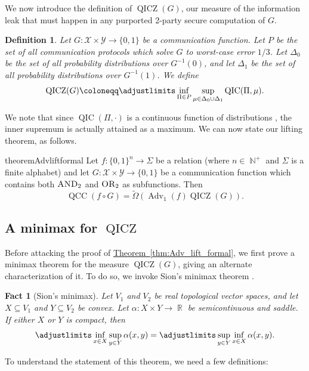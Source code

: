 \documentclass[10pt,a4paper]{article}
\newtheorem{definition}[theorem]{Definition}
\newtheorem{fact}[theorem]{Fact}
\theoremstyle{definition}
\newcommand{\thm}[1]{\hyperref[thm:#1]{Theorem~\ref*{thm:#1}}}
\newcommand{\tOmega}{\tilde{\Omega}}
\newcommand{\B}{\{0,1\}}
\newcommand{\X}{\mathcal{X}}
\newcommand{\Y}{\mathcal{Y}}
\renewcommand{\>}{\rangle}
\newcommand{\<}{\langle}
\DeclareMathOperator{\bR}{\mathbb{R}}
\DeclareMathOperator{\bN}{\mathbb{N}}
\newcommand{\OR}{\textsc{OR}}
\newcommand{\AND}{\textsc{AND}}
\DeclareMathOperator{\Adv}{Adv}
\DeclareMathOperator{\QCC}{QCC}
\DeclareMathOperator{\QICZ}{QICZ}
\DeclareMathOperator{\QIC}{QIC}
\begin{document}
We now introduce the definition of $\QICZ(G)$,
our measure of the information leak that must
happen in any purported 2-party secure computation of $G$.

\begin{definition}
Let $G\colon\X\times\Y\to\B$ be a communication function.
Let $P$ be the set of all communication protocols
which solve $G$ to worst-case error $1/3$.
Let $\Delta_0$ be the set of all probability
distributions over $G^{-1}(0)$, and let
$\Delta_1$ be the set of all probability distributions
over $G^{-1}(1)$. We define
\[\QICZ(G)\coloneqq\adjustlimits
\inf_{\Pi\in P}\sup_{\mu\in\Delta_0\cup\Delta_1}
\QIC(\Pi,\mu).\]
\end{definition}

We note that since $\QIC(\Pi,\cdot)$ is a continuous
function of distributions \cite{BGK+18}, the inner
supremum is actually attained as a maximum.
We can now state our lifting theorem, as follows.


\begin{restatable}{theorem}{Advliftformal}\label{thm:Adv_lift_formal}
Let $f\colon\B^n\to\Sigma$ be a relation
(where $n\in\bN^{+}$ and $\Sigma$ is a finite alphabet)
and let $G\colon\X\times\Y\to\B$ be a communication
function which contains both $\AND_2$ and $\OR_2$
as subfunctions. Then
\[\QCC(f\circ G)=\tOmega(\Adv_1(f)\QICZ(G)).\]
\end{restatable}



\subsection{A minimax for \texorpdfstring{$\QICZ$}{QICZ}}

Before attacking the proof of \thm{Adv_lift_formal},
we first prove a minimax theorem for the measure
$\QICZ(G)$, giving an alternate characterization of it.
To do so, we invoke Sion's minimax theorem \cite{Sio58}.

\begin{fact}[Sion's minimax]\label{fct:Sion}
Let $V_1$ and $V_2$ be real topological vector spaces,
and let $X\subseteq V_1$ and $Y\subseteq V_2$ be convex.
Let $\alpha\colon X\times Y\to\bR$ be semicontinuous and
saddle. If either $X$ or $Y$ is compact, then
\[\adjustlimits\inf_{x\in X}\sup_{y\in Y}\alpha(x,y)
=\adjustlimits\sup_{y\in Y}\inf_{x\in X}\alpha(x,y).\]
\end{fact}

To understand the statement of this theorem,
we need a few definitions:
\end{document}
